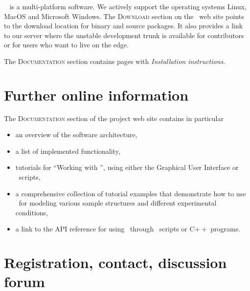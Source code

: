 \BornAgain\
%
%
is a multi-platform software.
We actively support the operating systems
Linux,
%
MacOS
%
and  Microsoft Windows.
%
%
The \textsc{Download} section on the \BornAgain\ web site
points to the download location for
binary and source packages.
It also provides a link to our  server
where the unstable development trunk is available
for contributors or for users who want to live on the edge.

The \textsc{Documentation} section contains
pages with \textit{Installation instructions}.


\section{Further online information}

The \textsc{Documentation} section of the project web site
contains in particular
\begin{itemize}
\item an overview of the software architecture,
\item a list of implemented functionality,
\item tutorials for ``Working with \BornAgain'',
      using either the Graphical User Interface or
      \Python\ scripts,
\item a comprehensive collection of tutorial examples that demonstrate
   how to use \BornAgain\ for modeling various sample structures
    and different experimental conditions,
\item a link to the API reference for using \BornAgain\ through
   \Python\ scripts or C$++$ programs.
%
%
%
\end{itemize}


\section{Registration, contact, discussion forum}\label{Snews}

